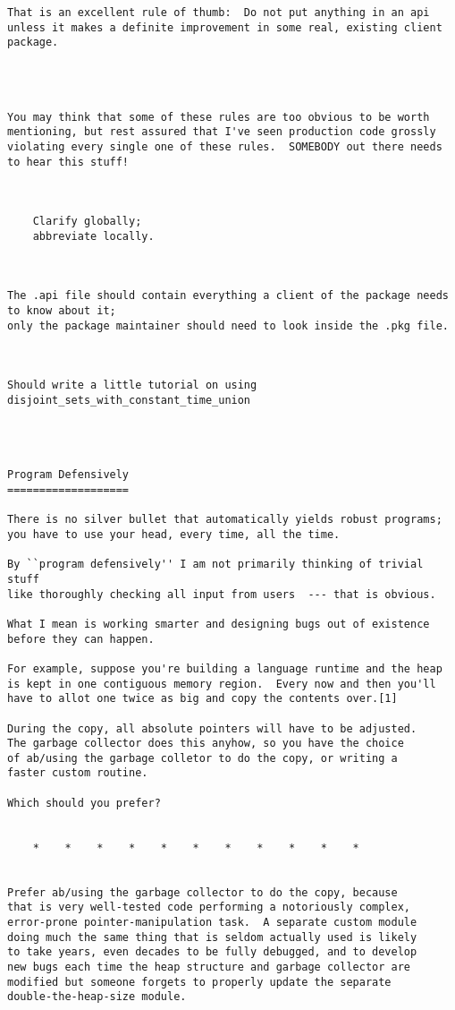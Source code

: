 \begin{verbatim}
That is an excellent rule of thumb:  Do not put anything in an api 
unless it makes a definite improvement in some real, existing client 
package. 




You may think that some of these rules are too obvious to be worth 
mentioning, but rest assured that I've seen production code grossly 
violating every single one of these rules.  SOMEBODY out there needs 
to hear this stuff! 



    Clarify globally; 
    abbreviate locally. 



The .api file should contain everything a client of the package needs to know about it; 
only the package maintainer should need to look inside the .pkg file. 



Should write a little tutorial on using disjoint_sets_with_constant_time_union 




Program Defensively 
=================== 

There is no silver bullet that automatically yields robust programs; 
you have to use your head, every time, all the time. 

By ``program defensively'' I am not primarily thinking of trivial stuff 
like thoroughly checking all input from users  --- that is obvious. 

What I mean is working smarter and designing bugs out of existence 
before they can happen. 

For example, suppose you're building a language runtime and the heap 
is kept in one contiguous memory region.  Every now and then you'll 
have to allot one twice as big and copy the contents over.[1] 

During the copy, all absolute pointers will have to be adjusted. 
The garbage collector does this anyhow, so you have the choice 
of ab/using the garbage colletor to do the copy, or writing a 
faster custom routine. 

Which should you prefer? 


    *    *    *    *    *    *    *    *    *    *    * 


Prefer ab/using the garbage collector to do the copy, because 
that is very well-tested code performing a notoriously complex, 
error-prone pointer-manipulation task.  A separate custom module 
doing much the same thing that is seldom actually used is likely 
to take years, even decades to be fully debugged, and to develop 
new bugs each time the heap structure and garbage collector are 
modified but someone forgets to properly update the separate 
double-the-heap-size module. 


\end{verbatim}
